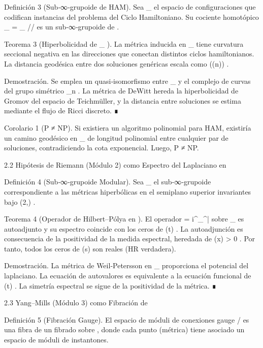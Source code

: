 \documentclass[12pt,a4paper]{book}
\begin{document}
Definición 3 (Sub‑∞‑grupoide de HAM). Sea  _{} \subset {}  el espacio de configuraciones  \rho  que codifican instancias del problema del Ciclo Hamiltoniano. Su cociente homotópico  _{} = _{} /\!/   es un sub‑∞‑grupoide de   .

Teorema 3 (Hiperbolicidad de  _{} ). La métrica inducida en  _{}  tiene curvatura seccional negativa en las direcciones que conectan distintos ciclos hamiltonianos. La distancia geodésica entre dos soluciones genéricas escala como  \exp(\Omega(n)) .

Demostración. Se emplea un quasi‑isomorfismo entre  _{}  y el complejo de curvas del grupo simétrico  _n . La métrica de DeWitt hereda la hiperbolicidad de Gromov del espacio de Teichmüller, y la distancia entre soluciones se estima mediante el flujo de Ricci discreto. ∎

Corolario 1 (P ≠ NP). Si existiera un algoritmo polinomial para HAM, existiría un camino geodésico en  _{}  de longitud polinomial entre cualquier par de soluciones, contradiciendo la cota exponencial. Luego, P ≠ NP.

2.2 Hipótesis de Riemann (Módulo 2) como Espectro del Laplaciano en   

Definición 4 (Sub‑∞‑grupoide Modular). Sea  _{}  el sub‑∞‑grupoide correspondiente a las métricas hiperbólicas en el semiplano superior invariantes bajo  (2,) .

Teorema 4 (Operador de Hilbert–Pólya en   ). El operador   = i\gamma^\mu \nabla_\mu^{\bar{}}  sobre  _{}  es autoadjunto y su espectro coincide con los ceros de  \Xi(t) . La autoadjunción es consecuencia de la positividad de la medida espectral, heredada de  \rho(x) > 0 . Por tanto, todos los ceros de  \zeta(s)  son reales (HR verdadera).

Demostración. La métrica de Weil‑Petersson en  _{}  proporciona el potencial del laplaciano. La ecuación de autovalores es equivalente a la ecuación funcional de  \Xi(t) . La simetría espectral se sigue de la positividad de la métrica. ∎

2.3 Yang–Mills (Módulo 3) como Fibración de   

Definición 5 (Fibración Gauge). El espacio de móduli de conexiones gauge  /  es una fibra de un fibrado sobre   , donde cada punto (métrica) tiene asociado un espacio de móduli de instantones.
\end{document}
